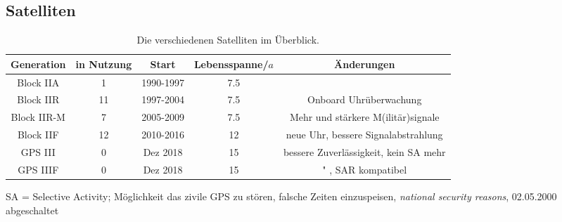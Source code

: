 \subsection{Satelliten}
\begin{table}
    \caption{Die verschiedenen Satelliten im Überblick.}
    \label{tab:satelliten}
    \begin{tabular}{c S[table-format=2.0] c S[table-format=2.1] c}
        \toprule
        {Generation} & {in Nutzung} & {Start} & {Lebensspanne\;/\;$a$} & {Änderungen} \\
        \midrule
        Block IIA   &  1 & 1990-1997 & 7.5 & \\
        Block IIR   & 11 & 1997-2004 & 7.5 & Onboard Uhrüberwachung \\
        Block IIR-M &  7 & 2005-2009 & 7.5 & Mehr und stärkere M(ilitär)signale \\
        Block IIF   & 12 & 2010-2016 & 12  & neue Uhr, bessere Signalabstrahlung \\
        GPS III     &  0 & Dez 2018  & 15  & bessere Zuverlässigkeit, kein SA mehr \\
        GPS IIIF    &  0 & Dez 2018  & 15  & " , SAR kompatibel \\
        \bottomrule
    \end{tabular}
\end{table}
SA = Selective Activity; Möglichkeit das zivile GPS zu stören, falsche Zeiten einzuspeisen, \textit{national security reasons}, 02.05.2000 abgeschaltet
